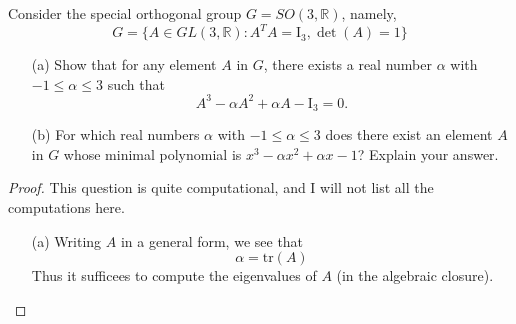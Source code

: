 \documentclass[openany]{book}
\begin{document}
\begin{prob}
    Consider the special orthogonal group \(G=SO(3,\mathbb{R})\), namely,
    \[G=\{A\in GL(3,\mathbb{R}): A^T A=\mathrm{I}_3, \det(A)=1\}\]
    \begin{itemize}
        \item[(a)] Show that for any element \(A\) in \(G\), there exists a real number \(\alpha\) with \(-1\leq\alpha\leq 3\) such that
        \[A^3-\alpha A^2+\alpha A-\mathrm{I}_3=0.\]
        \item[(b)] For which real numbers \(\alpha\) with \(-1\leq\alpha\leq 3\) does there exist an element \(A\) in \(G\) whose minimal polynomial is \(x^3-\alpha x^2+\alpha x-1\)? Explain your answer.
    \end{itemize}
\end{prob}
\begin{proof}
    This question is quite computational, and I will not list all the computations here.
    \begin{itemize}
        \item[(a)] Writing $A$ in a general form, we see that 
        \begin{equation*}
            \alpha=\text{tr}(A)
        \end{equation*}
        Thus it sufficees to compute the eigenvalues of $A$ (in the algebraic closure). 
    \end{itemize}
    
\end{proof}
\end{document}
